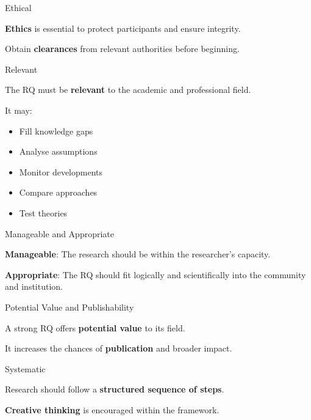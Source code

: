 \begin{frame}{Ethical}
  \begin{block}{}
    \onslide<+-> \textbf{Ethics} is essential to protect participants and ensure
    integrity.

    \vspace{0.3cm}

    \onslide<+-> Obtain \textbf{clearances} from relevant authorities before
    beginning.
  \end{block}
\end{frame}

\begin{frame}{Relevant}
  \begin{block}{}
    \onslide<+-> The RQ must be \textbf{relevant} to the academic and
    professional field.

    \onslide<+-> It may:
    \begin{itemize}
      \onslide<+-> \item Fill knowledge gaps
      \onslide<+-> \item Analyse assumptions
      \onslide<+-> \item Monitor developments
      \onslide<+-> \item Compare approaches
      \onslide<+-> \item Test theories
  \end{itemize}
\end{block}
\end{frame}

\begin{frame}{Manageable and Appropriate}
  \begin{block}{}
    \onslide<+-> \textbf{Manageable}: The research should be within the
    researcher's capacity.

    \vspace{0.3cm}

    \onslide<+-> \textbf{Appropriate}: The RQ should fit logically and
    scientifically into the community and institution.
  \end{block}
\end{frame}

\begin{frame}{Potential Value and Publishability}
  \begin{block}{}
    \onslide<+-> A strong RQ offers \textbf{potential value} to its field.

    \vspace{0.3cm}

    \onslide<+-> It increases the chances of \textbf{publication} and broader
    impact.
  \end{block}
\end{frame}

\begin{frame}{Systematic}
  \begin{block}{}
    \onslide<+-> Research should follow a \textbf{structured sequence of steps}.

    \vspace{0.3cm}

    \onslide<+-> \textbf{Creative thinking} is encouraged within the framework.
  \end{block}
\end{frame}

